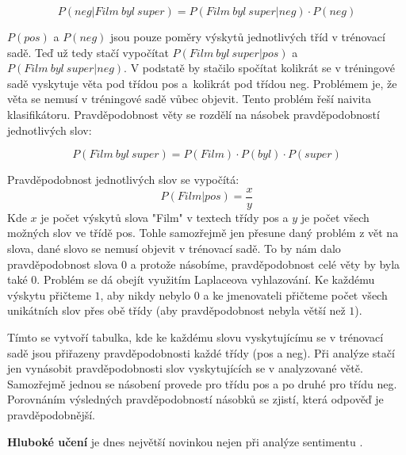 \begin{equation}
  P(neg|Film\:byl\:super)=P(Film\:byl\:super|neg)\cdot P(neg)
\end{equation}

$P(pos)$ a $P(neg)$ jsou pouze poměry výskytů jednotlivých tříd v trénovací sadě. Teď už tedy stačí vypočítat $P(Film\:byl\:super|pos)$ a $P(Film\:byl\:super|neg)$. V podstatě by stačilo spočítat kolikrát se v tréningové sadě vyskytuje věta  pod třídou pos a~kolikrát pod třídou neg. Problémem je, že věta se nemusí v tréningové sadě vůbec objevit. Tento problém řeší naivita klasifikátoru. Pravděpodobnost věty se rozdělí na násobek pravděpodobností jednotlivých slov:

\begin{equation}
  P(Film\:byl\:super)=P(Film) \cdot P(byl) \cdot P(super)
\end{equation}

Pravděpodobnost jednotlivých slov se vypočítá:
\begin{equation}
  P(Film|pos)=\frac{x}{y}
\end{equation}
Kde $x$ je počet výskytů slova "Film" v textech třídy pos a $y$ je počet všech možných slov ve třídě pos.
Tohle samozřejmě jen přesune daný problém z vět na slova, dané slovo se nemusí objevit v trénovací sadě. To by nám dalo pravděpodobnost slova $0$ a protože násobíme, pravděpodobnost celé věty by byla také $0$. Problém se dá obejít využitím Laplaceova vyhlazování. Ke každému výskytu přičteme $1$, aby nikdy nebylo $0$ a ke jmenovateli přičteme počet všech unikátních slov přes obě třídy (aby pravděpodobnost nebyla větší než $1$).

Tímto se vytvoří tabulka, kde ke každému slovu vyskytujícímu se v trénovací sadě jsou přiřazeny pravděpodobnosti každé třídy (pos a neg). 
Při analýze stačí jen vynásobit pravděpodobnosti slov vyskytujících se v analyzované větě. Samozřejmě jednou se násobení provede pro třídu pos a po druhé pro třídu neg. Porovnáním výsledných pravděpodobností násobků se zjistí, která odpověď je pravděpodobnější.


\textbf{Hluboké učení} je dnes největší novinkou nejen při analýze sentimentu \cite{survey} \cite{survey2}.

